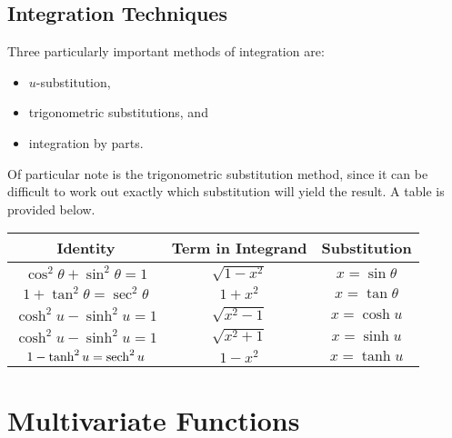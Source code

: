 \documentclass{article}
\begin{document}
	\subsection{Integration Techniques}
	Three particularly important methods of integration are:
	\begin{itemize}
		\item $u$-substitution,
		\item trigonometric substitutions, and
		\item integration by parts.
	\end{itemize}
	Of particular note is the trigonometric substitution method, since it can be difficult to work out exactly which substitution will yield the result. A table is provided below.
	
	\medskip\noindent\begin{tabular}{c c c}
		Identity & Term in Integrand & Substitution \\\hline
		$\cos^2 \theta + \sin^2 \theta = 1$ & $\sqrt{1 - x^2}$ & $x = \sin \theta$ \\
		$1 + \tan^2 \theta = \sec^2 \theta$ & $1 + x^2$ & $x = \tan \theta$ \\
		$\cosh^2 u - \sinh^2 u = 1$ & $\sqrt{x^2 - 1}$ & $x = \cosh u$ \\
		$\cosh^2 u - \sinh^2 u = 1$ & $\sqrt{x^2 + 1}$ & $x = \sinh u$ \\
		$1 - \tanh^2 u = \sech^2 u$ & $1 - x^2$ & $x = \tanh u$
	\end{tabular}

	\section{Multivariate Functions}
\end{document}
